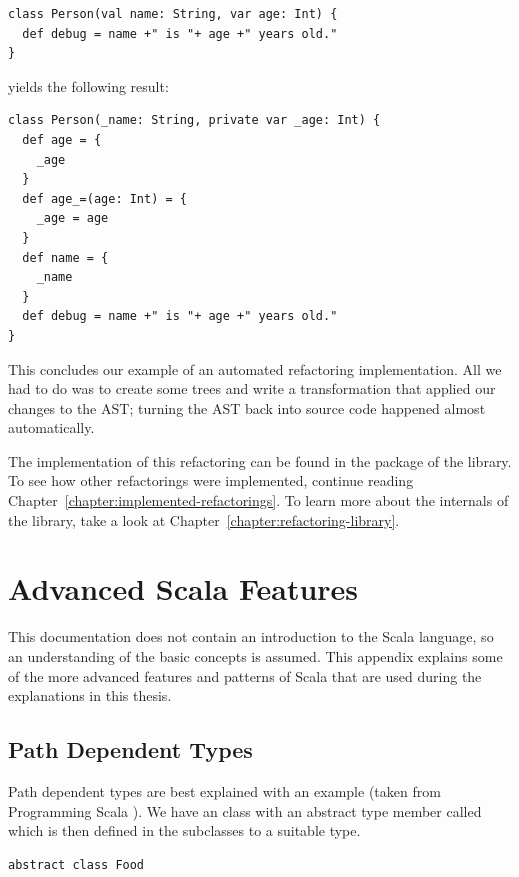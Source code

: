 \documentclass[10pt,a4paper,oneside]{scrreprt}
\begin{document}
{\begin{lstlisting}
class Person(val name: String, var age: Int) {
  def debug = name +" is "+ age +" years old."
}
\end{lstlisting}

yields the following result:

\begin{lstlisting}
class Person(_name: String, private var _age: Int) {
  def age = {
    _age
  }
  def age_=(age: Int) = {
    _age = age
  }
  def name = {
    _name
  }
  def debug = name +" is "+ age +" years old."
}
\end{lstlisting}

This concludes our example of an automated refactoring implementation. All we had to do was to create some trees and write a transformation that applied our changes to the AST; turning the AST back into source code happened almost automatically.

The implementation of this refactoring can be found in the  package of the library. To see how other refactorings were implemented, continue reading Chapter~\vref{chapter:implemented-refactorings}. To learn more about the internals of the library, take a look at Chapter~\vref{chapter:refactoring-library}.

\label{end-chapter:developer-how-to}



\emptypage

\chapter{Advanced Scala Features} \label{chapter:advanced-scala-features}

This documentation does not contain an introduction to the Scala language, so an understanding of the basic concepts is assumed. This appendix explains some of the more advanced features and patterns of Scala that are used during the explanations in this thesis.

\section{Path Dependent Types} \label{section:path-dependent-types}

Path dependent types are best explained with an example (taken from Programming Scala \cite{ProgrammingScala}). We have an  class with an abstract type member called  which is then defined in the subclasses to a suitable type.
\begin{lstlisting}
abstract class Food


\end{lstlisting}}
\end{document}
